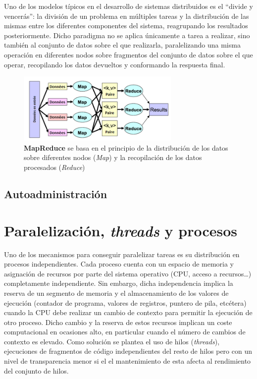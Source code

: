 Uno de los modelos típicos en el desarrollo de sistemas distribuidos es el ``divide y vencerás'': la división de un problema en múltiples tareas y la distribución de las mismas entre los diferentes componentes del sistema, reagrupando los resultados posteriormente. Dicho paradigma no se aplica únicamente a tarea a realizar, sino también al conjunto de datos sobre el que realizarla, paralelizando una misma operación en diferentes nodos sobre fragmentos del conjunto de datos sobre el que operar, recopilando los datos devueltos y conformando la respuesta final.


\begin{figure}[H]
\centering
\includegraphics[width=0.7\textwidth]{Chapter2/Figures/Mapreduce.png}
\caption{\textbf{MapReduce} se basa en el principio de la distribución de los datos sobre diferentes nodos (\textit{Map}) y la recopilación de los datos procesados (\textit{Reduce})}
\label{fig:mapreduce}
\end{figure}

\subsection{Autoadministración}


\section{Paralelización, \textit{threads} y procesos}

Uno de los mecanismos para conseguir paralelizar tareas es su distribución en procesos independientes. Cada proceso cuenta con un espacio de memoria y asignación de recursos por parte del sistema operativo (CPU, acceso a recursos\dots) completamente independiente. Sin embargo, dicha independencia implica la reserva de un segmento de memoria y el almacenamiento de los valores de ejecución (contador de programa, valores de registros, puntero de pila, etcétera) cuando la CPU debe realizar un cambio de contexto para permitir la ejecución de otro proceso. Dicho cambio y la reserva de estos recursos implican un coste computacional en ocasiones alto, en particular cuando el número de cambios de contexto es elevado. Como solución se plantea el uso de hilos (\textit{threads}), ejecuciones de fragmentos de código independientes del resto de hilos pero con un nivel de transparencia menor si el el mantenimiento de esta afecta al rendimiento del conjunto de hilos.

